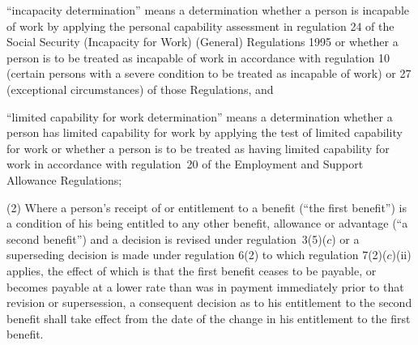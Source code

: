 \documentclass[12pt,a4paper]{article}
\begin{document}
\begin{enumerate}
“incapacity determination” means a determination whether a person is incapable of work by applying the 
personal capability assessment  %
in regulation 24 of the Social Security (Incapacity for Work) (General) Regulations 1995 or whether a person is to be treated as incapable of work in accordance with regulation 10 (certain persons with a severe condition to be treated as incapable of work) or 27 (exceptional circumstances) of those Regulations, and

“limited capability for work determination” means a determination whether a person has limited capability for work by applying the test of limited capability for work or whether a person is to be treated as having limited capability for work in accordance with regulation~20 of the Employment and Support Allowance Regulations;

\end{enumerate}

(2) Where a person’s receipt of or entitlement to a benefit (“the first benefit”) is a condition of his being entitled to any other benefit, allowance or advantage (“a second benefit”) and a decision is revised under regulation~3(5)($c$) or a superseding decision is made under regulation 6(2) to which regulation 7(2)($c$)(ii) applies, the effect of which is that the first benefit ceases to be payable, or becomes payable at a lower rate than was in payment immediately prior to that revision or supersession, a consequent decision as to his entitlement to the second benefit shall take effect from the date of the change in his entitlement to the first benefit.
\end{document}

